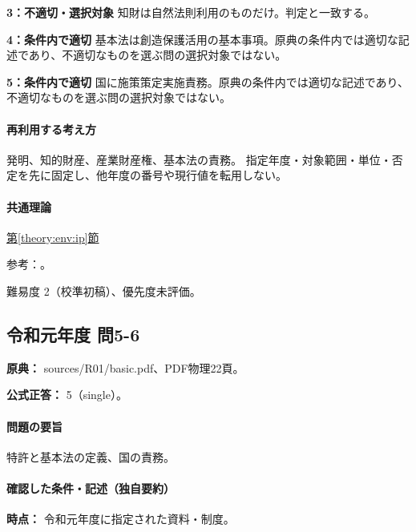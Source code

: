 \noindent\textbf{3：不適切・選択対象} 知財は自然法則利用のものだけ。判定と一致する。\par

\noindent\textbf{4：条件内で適切} 基本法は創造保護活用の基本事項。原典の条件内では適切な記述であり、不適切なものを選ぶ問の選択対象ではない。\par

\noindent\textbf{5：条件内で適切} 国に施策策定実施責務。原典の条件内では適切な記述であり、不適切なものを選ぶ問の選択対象ではない。\par

\paragraph{再利用する考え方} 発明、知的財産、産業財産権、基本法の責務。 指定年度・対象範囲・単位・否定を先に固定し、他年度の番号や現行値を転用しない。

\paragraph{共通理論} \hyperref[theory:env:ip]{第\ref*{theory:env:ip}節}

\par 参考：\cite{ip_patent_statute,ip_broad_scope}。

\par 難易度 2（校準初稿）、優先度未評価。

\subsection{令和元年度 問5-6}
\label{q:r01-reg-basic-5-6}

\noindent\textbf{原典：} sources/R01/basic.pdf、PDF物理22頁。

\textbf{公式正答：} 5（single）。

\paragraph{問題の要旨} 特許と基本法の定義、国の責務。

\paragraph{確認した条件・記述（独自要約）}\mbox{}\par

\noindent\textbf{時点：} 令和元年度に指定された資料・制度。\par

